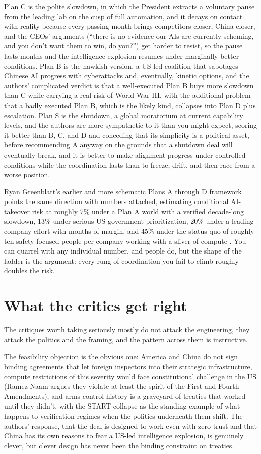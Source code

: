 \documentclass[11pt,letterpaper]{article}
\begin{document}
Plan C is the polite slowdown, in which the President extracts a voluntary pause from the leading lab on the cusp of full automation, and it decays on contact with reality because every passing month brings competitors closer, China closer, and the CEOs' arguments (``there is no evidence our AIs are currently scheming, and you don't want them to win, do you?'') get harder to resist, so the pause lasts months and the intelligence explosion resumes under marginally better conditions. Plan B is the hawkish version, a US-led coalition that sabotages Chinese AI progress with cyberattacks and, eventually, kinetic options, and the authors' complicated verdict is that a well-executed Plan B buys more slowdown than C while carrying a real risk of World War III, with the additional problem that a badly executed Plan B, which is the likely kind, collapses into Plan D plus escalation. Plan S is the shutdown, a global moratorium at current capability levels, and the authors are more sympathetic to it than you might expect, scoring it better than B, C, and D and conceding that its simplicity is a political asset, before recommending A anyway on the grounds that a shutdown deal will eventually break, and it is better to make alignment progress under controlled conditions while the coordination lasts than to freeze, drift, and then race from a worse position.

Ryan Greenblatt's earlier and more schematic Plans A through D framework points the same direction with numbers attached, estimating conditional AI-takeover risk at roughly 7\% under a Plan A world with a verified decade-long slowdown, 13\% under serious US government prioritization, 20\% under a leading-company effort with months of margin, and 45\% under the status quo of roughly ten safety-focused people per company working with a sliver of compute \citep{greenblatt}. You can quarrel with any individual number, and people do, but the shape of the ladder is the argument: every rung of coordination you fail to climb roughly doubles the risk.

\section{What the critics get right}

The critiques worth taking seriously mostly do not attack the engineering, they attack the politics and the framing, and the pattern across them is instructive.

The feasibility objection is the obvious one: America and China do not sign binding agreements that let foreign inspectors into their strategic infrastructure, compute restrictions of this severity would face constitutional challenge in the US (Ramez Naam argues they violate at least the spirit of the First and Fourth Amendments), and arms-control history is a graveyard of treaties that worked until they didn't, with the START collapse as the standing example of what happens to verification regimes when the politics underneath them shift. The authors' response, that the deal is designed to work even with zero trust and that China has its own reasons to fear a US-led intelligence explosion, is genuinely clever, but clever design has never been the binding constraint on treaties.
\end{document}
